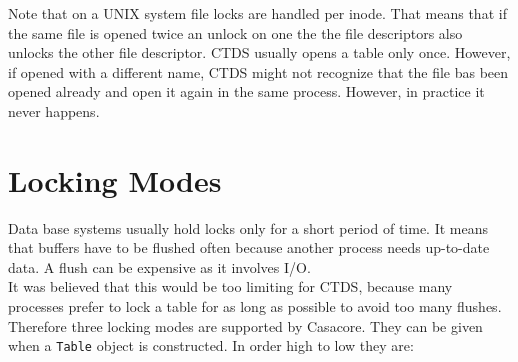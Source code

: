 \medskip
Note that on a UNIX system file locks are handled per inode. That
means that if the same file is opened twice an unlock on one the the
file descriptors also unlocks the other file descriptor.
CTDS usually opens a table only once. However, if opened
with a different name, CTDS might not recognize that
the file bas been opened already and open it again in the same process.
However, in practice it never happens.


\section{\label{TABLELOCK:LOCKINGMODES}Locking Modes}
Data base systems usually hold locks only for a short period of time. It means
that buffers have to be flushed often because another process needs
up-to-date data. A flush can be expensive as it involves I/O.
\\It was believed that this would be too limiting for CTDS,
because many processes prefer to lock a table for as
long as possible to avoid too many flushes.
Therefore three locking modes are supported by Casacore. They can be
given when a \texttt{Table} object is constructed. In order high to low
they are:

